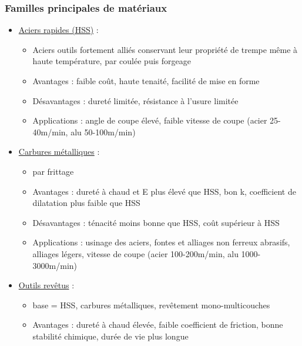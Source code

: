 \documentclass[../main.tex]{subfiles}
\begin{document}
\subsubsection{Familles principales de matériaux}
\begin{itemize}
    \item \underline{Aciers rapides (HSS)} :\begin{itemize}
        \item Aciers outils fortement alliés conservant leur propriété de trempe même à haute température, par coulée puis forgeage\\
        \item Avantages : faible coût, haute tenaité, facilité de mise en forme\\
        \item  Désavantages : dureté limitée, résistance à l'usure limitée\\
        \item Applications : angle de coupe élevé, faible vitesse de coupe (acier 25-40m/min, alu 50-100m/min)\\
    \end{itemize}
        \item \underline{Carbures métalliques} :\begin{itemize}
        \item par frittage\\
        \item Avantages : dureté à chaud et E plus élevé que HSS, bon k, coefficient de dilatation plus faible que HSS\\
        \item  Désavantages : ténacité moins bonne que HSS, coût supérieur à HSS\\
        \item Applications : usinage des aciers, fontes et alliages non ferreux abrasifs, alliages légers, vitesse de coupe (acier 100-200m/min, alu 1000-3000m/min)\\
    \end{itemize}
        \item \underline{Outils revêtus} :\begin{itemize}
        \item base = HSS, carbures métalliques, revêtement mono-multicouches\\
        \item Avantages : dureté à chaud élevée, faible coefficient de friction, bonne stabilité chimique, durée de vie plus longue\\

\end{itemize}
\end{itemize}
\end{document}
